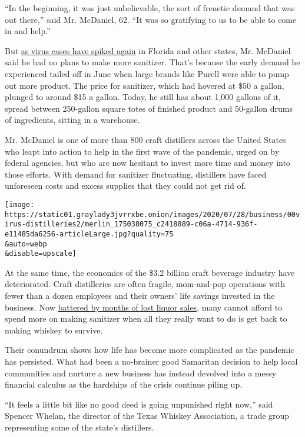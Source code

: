``In the beginning, it was just unbelievable, the sort of frenetic
demand that was out there,'' said Mr. McDaniel, 62. ``It was so
gratifying to us to be able to come in and help.''

But
\href{https://www.nytimes3xbfgragh.onion/interactive/2020/world/coronavirus-maps.html?action=click\&module=Top\%20Stories\&pgtype=Homepage}{as
virus cases have spiked again} in Florida and other states, Mr. McDaniel
said he had no plans to make more sanitizer. That's because the early
demand he experienced tailed off in June when large brands like Purell
were able to pump out more product. The price for sanitizer, which had
hovered at \$50 a gallon, plunged to around \$15 a gallon. Today, he
still has about 1,000 gallons of it, spread between 250-gallon square
totes of finished product and 50-gallon drums of ingredients, sitting in
a warehouse.

Mr. McDaniel is one of more than 800 craft distillers across the United
States who leapt into action to help in the first wave of the pandemic,
urged on by federal agencies, but who are now hesitant to invest more
time and money into those efforts. With demand for sanitizer
fluctuating, distillers have faced unforeseen costs and excess supplies
that they could not get rid of.

\texttt{[image: https://static01.graylady3jvrrxbe.onion/images/2020/07/28/business/00virus-distilleries2/merlin\_175038075\_c2418889-c06a-4714-936f-e11485da6256-articleLarge.jpg?quality=75\\\&auto=webp\\\&disable=upscale]}

At the same time, the economics of the \$3.2 billion craft beverage
industry have deteriorated. Craft distilleries are often fragile,
mom-and-pop operations with fewer than a dozen employees and their
owners' life savings invested in the business. Now
\href{https://www.nytimes3xbfgragh.onion/2020/04/23/dining/drinks/craft-distillers-coronavirus.html}{battered
by months of lost liquor sales}, many cannot afford to spend more on
making sanitizer when all they really want to do is get back to making
whiskey to survive.

Their conundrum shows how life has become more complicated as the
pandemic has persisted. What had been a no-brainer good Samaritan
decision to help local communities and nurture a new business has
instead devolved into a messy financial calculus as the hardships of the
crisis continue piling up.

``It feels a little bit like no good deed is going unpunished right
now,'' said Spencer Whelan, the director of the Texas Whiskey
Association, a trade group representing some of the state's distillers.

